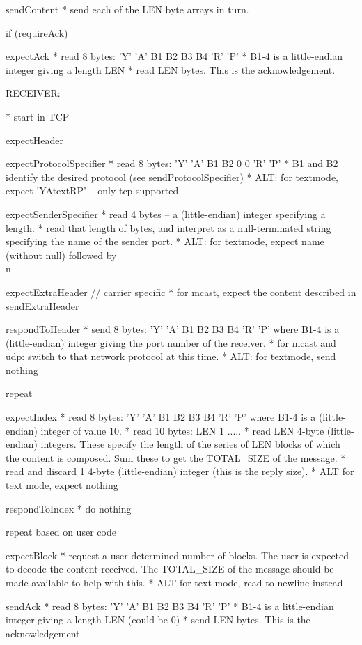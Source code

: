 \documentclass[a4]{article}
\begin{document}
\begin{code}
    sendContent
    * send each of the LEN byte arrays in turn.

  if (requireAck)

    expectAck
    * read 8 bytes: 'Y' 'A' B1 B2 B3 B4 'R' 'P'
    * B1-4 is a little-endian integer giving a length LEN
    * read LEN bytes.  This is the acknowledgement.

RECEIVER:

  * start in TCP

  expectHeader

    expectProtocolSpecifier
    * read 8 bytes: 'Y' 'A' B1 B2 0 0 'R' 'P'
    * B1 and B2 identify the desired protocol (see sendProtocolSpecifier)
    * ALT: for textmode, expect 'YAtextRP' -- only tcp supported

    expectSenderSpecifier
    * read 4 bytes -- a (little-endian) integer specifying a length.
    * read that length of bytes, and interpret as a null-terminated
      string specifying the name of the sender port.
    * ALT: for textmode, expect name (without null) followed by \\n

    expectExtraHeader        // carrier specific
    * for mcast, expect the content described in sendExtraHeader

  respondToHeader
  * send 8 bytes: 'Y' 'A' B1 B2 B3 B4 'R' 'P' where B1-4 is a 
    (little-endian) integer giving the port number of the receiver.
  * for mcast and udp: switch to that network protocol at this time.
  * ALT: for textmode, send nothing

  repeat

    expectIndex
    * read 8 bytes: 'Y' 'A' B1 B2 B3 B4 'R' 'P' where B1-4 is a 
    (little-endian) integer of value 10.
    * read 10 bytes: LEN 1 .....
    * read LEN 4-byte (little-endian) integers.  These specify
      the length of the series of LEN blocks of which the
      content is composed.  Sum these to get the TOTAL_SIZE of the 
      message.
    * read and discard 1 4-byte (little-endian) integer (this is
      the reply size).
    * ALT for text mode, expect nothing

    respondToIndex
    * do nothing

    repeat based on user code
    
      expectBlock
      * request a user determined number of blocks.  The user
        is expected to decode the content received.  The TOTAL_SIZE
	of the message should be made available to help with this.
      * ALT for text mode, read to newline instead

    sendAck
    * read 8 bytes: 'Y' 'A' B1 B2 B3 B4 'R' 'P'
    * B1-4 is a little-endian integer giving a length LEN (could be 0)
    * send LEN bytes.  This is the acknowledgement.


\end{code}
\end{document}
